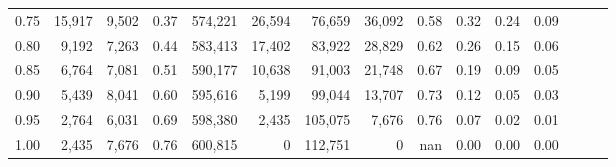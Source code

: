 \begin{tabular}{rrrrrrrrrrrrrrr}
0.75 &  15,917 &   9,502 &  0.37 &  574,221 &   26,594 &   76,659 &   36,092 &  0.58 &  0.32 &  0.24 &      0.09 \\
0.80 &   9,192 &   7,263 &  0.44 &  583,413 &   17,402 &   83,922 &   28,829 &  0.62 &  0.26 &  0.15 &      0.06 \\
0.85 &   6,764 &   7,081 &  0.51 &  590,177 &   10,638 &   91,003 &   21,748 &  0.67 &  0.19 &  0.09 &      0.05 \\
0.90 &   5,439 &   8,041 &  0.60 &  595,616 &    5,199 &   99,044 &   13,707 &  0.73 &  0.12 &  0.05 &      0.03 \\
0.95 &   2,764 &   6,031 &  0.69 &  598,380 &    2,435 &  105,075 &    7,676 &  0.76 &  0.07 &  0.02 &      0.01 \\
1.00 &   2,435 &   7,676 &  0.76 &  600,815 &        0 &  112,751 &        0 &   nan &  0.00 &  0.00 &      0.00 \\
\bottomrule
\end{tabular}
